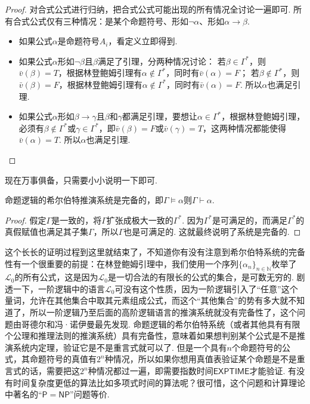 \begin{proof}
    对合式公式进行归纳，把合式公式可能出现的所有情况全讨论一遍即可. 所有合式公式仅有三种情况：是某个命题符号、形如\(\neg \alpha\)、形如\(\alpha \to \beta\).
    \begin{itemize}
        \item 如果公式\(\alpha\)是命题符号\(A_i\)，看定义立即得到. 
        \item 如果公式\(\alpha\)形如\(\neg \beta\)且\(\beta\)满足了引理，分两种情况讨论：\newline
        若\(\beta \in \Gamma^*\)，则\(\bar v(\beta)=T\)，根据林登鲍姆引理有\(\alpha \not \in \Gamma^*\)，同时有\(\bar v(\alpha) = F\)；\newline
        若\(\beta \not \in \Gamma^*\)，则\(\bar v(\beta)=F\)，根据林登鲍姆引理有\(\alpha \not \in \Gamma^*\)，同时有\(\bar v(\alpha) = F\). \newline
        所以\(\alpha\)也满足引理. 
        \item 如果公式\(\alpha\)形如\(\beta \to \gamma\)且\(\beta\)和\(\gamma\)都满足引理，要想让\(\alpha \in \Gamma^*\)，根据林登鲍姆引理，必须有\(\beta \not \in \Gamma^*\)或\(\gamma \in \Gamma^*\)，即\(\bar v(\beta)=F\)或\(\bar v(\gamma)=T\)，这两种情况都能使得\(\bar v(\alpha)=T\). 所以\(\alpha\)也满足引理.
    \end{itemize}
\end{proof}

现在万事俱备，只需要小小说明一下即可.

\begin{theorem}{}
    命题逻辑的希尔伯特推演系统是完备的，即\(\Gamma \vDash \alpha\)则\(\Gamma \vdash \alpha\).
\end{theorem}

\begin{proof}
    假定\(\Gamma\)是一致的，将\(\Gamma\)扩张成极大一致的\(\Gamma^*\). 因为\(\Gamma^*\)是可满足的，而满足\(\Gamma^*\)的真假赋值也满足其子集\(\Gamma\)，所以\(\Gamma\)也是可满足的. 这就最终说明了系统是完备的.
\end{proof}

这个长长的证明过程到这里就结束了，不知道你有没有注意到希尔伯特系统的完备性有一个很重要的前提：在林登鲍姆引理中，我们使用一个序列\(\{\alpha_n\}_{n \in \mathbb{N}}\)枚举了\(\mathcal{L}_0\)的所有公式，这是因为\(\mathcal{L}_0\)是一切合法的有限长的公式的集合，是可数无穷的. 剧透一下，一阶逻辑中的语言\(\mathcal{L}_0\)可没有这个性质，因为一阶逻辑引入了“任意”这个量词，允许在其他集合中取其元素组成公式，而这个“其他集合”的势有多大就不知道了，所以一阶逻辑乃至后面的高阶逻辑语言的推演系统就没有完备性了，这个问题由哥德尔和冯·诺伊曼最先发现. 命题逻辑的希尔伯特系统（或者其他具有有限个公理和推理法则的推演系统）具有完备性，意味着如果想判别某个公式是不是推演系统内定理，验证它是不是重言式就可以了. 但是一个具有\(n\)个命题符号的公式，其命题符号的真值有\(2^n\)种情况，所以如果你想用真值表验证某个命题是不是重言式的话，需要把这\(2^n\)种情况都过一遍，即需要指数时间\(\mathsf{EXPTIME}\)才能验证. 有没有时间复杂度更低的算法比如多项式时间的算法呢？很可惜，这个问题和计算理论中著名的“\(\mathsf{P} = \mathsf{NP}\)”问题等价. 

